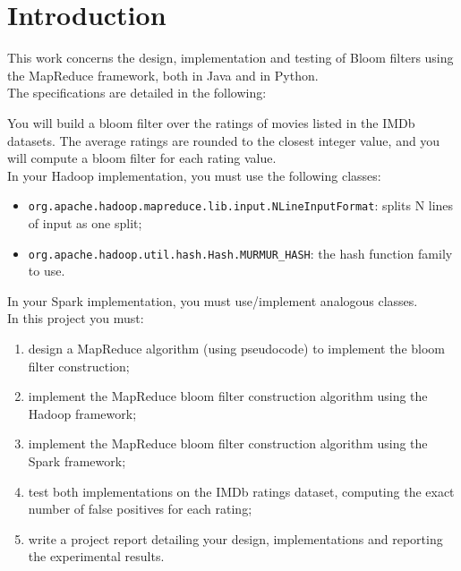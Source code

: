 %
\chapter{Introduction}\label{introduction}
This work concerns the design, implementation and testing of Bloom filters using the MapReduce framework, both in Java and in Python.\\
The specifications are detailed in the following:

\begin{displayquote}
    \begin{specifications}
	You will build a bloom filter over the ratings of movies listed in the \color{red}IMDb datasets\color{black}. The average ratings are rounded to the closest integer value, and you will compute a bloom filter for each rating value.\\
	In your Hadoop implementation, you must use the following classes:
	\begin{itemize}
		\item \texttt{org.apache.hadoop.mapreduce.lib.input.NLineInputFormat}: splits N lines of input as one split;
		\item \texttt{org.apache.hadoop.util.hash.Hash.MURMUR\_HASH}: the hash function family to use.
	\end{itemize}
	In your Spark implementation, you must use/implement analogous classes.\\
	In this project you must:
	\begin{enumerate}
	\item design a MapReduce algorithm (using pseudocode) to implement the bloom filter construction;
	\item implement the MapReduce bloom filter construction algorithm using the Hadoop framework;
	\item implement the MapReduce bloom filter construction algorithm using the Spark framework;
	\item test both implementations on the IMDb ratings dataset, computing the exact number of false positives for each
rating;
	\item write a project report detailing your design, implementations and reporting the experimental results.
	\end{enumerate}
    \end{specifications}
\end{displayquote}
